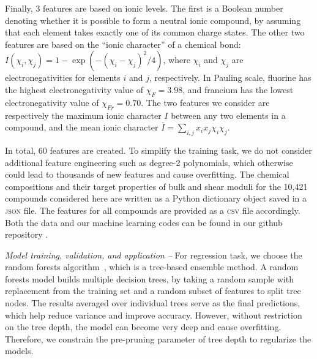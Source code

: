 	Finally, 3 features are based on ionic levels. The first is a Boolean number denoting whether it is possible to form a neutral ionic compound, by assuming that each element takes exactly one of its common charge states. The other two features are based on the ``ionic character'' of a chemical bond: $I(\chi_i, \chi_j)= 1- \exp( - (\chi_i-\chi_j)^2/4)$, where $\chi_i$ and $\chi_j$ are electronegativities for elements $i$ and $j$, respectively. In Pauling scale, fluorine has the highest electronegativity value of $\chi_F= 3.98$, and francium has the lowest electronegativity value of $\chi_{Fr} = 0.70$. The two features we consider are respectively the maximum ionic character $I$ between any two elements in a compound, and the mean ionic character $\bar I = \sum_{i,j} x_i x_j \chi_i \chi_j$.
	
	In total, 60 features are created. To simplify the training task, we do not consider additional feature engineering such as degree-2 polynomials, which otherwise could lead to thousands of new features and cause overfitting. The chemical compositions and their target properties of bulk and shear moduli for the 10,421 compounds considered here are written as a Python dictionary object saved in a \textsc{json} file. The features for all compounds are provided as a \textsc{csv} file accordingly. Both the data and our machine learning codes can be found in our github repository \cite{GitHub_Chen}.
	
	{\it Model training, validation, and application --} For regression task, we choose the random forests algorithm~\cite{ho1998, amit1997shape},
	which is a tree-based ensemble method. A random forests model builds multiple decision trees, by taking a random sample with replacement from the training set and a random subset of features to split tree nodes. The results averaged over individual trees serve as the final predictions, which help reduce variance and improve accuracy. However, without restriction on the tree depth, the model can become very deep and cause overfitting. Therefore, we constrain the pre-pruning parameter of tree depth to regularize the models.
	
